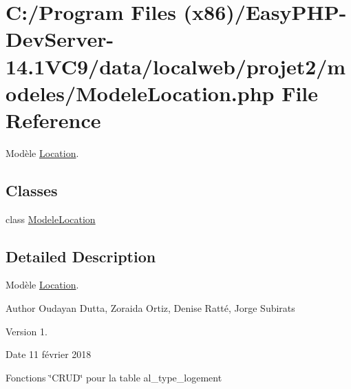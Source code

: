 \hypertarget{_modele_location_8php}{}\section{C\+:/\+Program Files (x86)/\+Easy\+P\+H\+P-\/\+Dev\+Server-\/14.1\+V\+C9/data/localweb/projet2/modeles/\+Modele\+Location.php File Reference}
\label{_modele_location_8php}


Modèle \hyperlink{class_location}{Location}.  


\subsection*{Classes}
\begin{DoxyCompactItemize}
\item 
class \hyperlink{class_modele_location}{Modele\+Location}
\end{DoxyCompactItemize}


\subsection{Detailed Description}
Modèle \hyperlink{class_location}{Location}. 

\begin{DoxyAuthor}{Author}
Oudayan Dutta, Zoraida Ortiz, Denise Ratté, Jorge Subirats 
\end{DoxyAuthor}
\begin{DoxyVersion}{Version}
1. 
\end{DoxyVersion}
\begin{DoxyDate}{Date}
11 février 2018
\end{DoxyDate}
Fonctions \char`\"{}\+C\+R\+U\+D\char`\"{} pour la table al\+\_\+type\+\_\+logement 